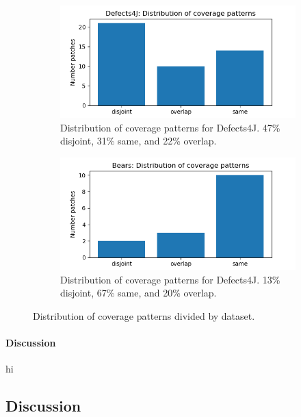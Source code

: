 \begin{figure}[h]
	\begin{subfigure}{\linewidth}
		\includegraphics[width=\linewidth]{img/coverage-d4j.png}
		\caption{Distribution of coverage patterns for Defects4J. 47\% disjoint, 31\% same, and 22\% 
		overlap.}
	\end{subfigure}
	\begin{subfigure}{\linewidth}
		\includegraphics[width=\linewidth]{img/coverage-bears.png}
		\caption{Distribution of coverage patterns for Defects4J. 13\% disjoint, 67\% same, and 20\% 
		overlap.}
	\end{subfigure}
	\caption{Distribution of coverage patterns divided by dataset.}
	\label{fig:coverage-datasets}
\end{figure}

\paragraph{Discussion}

hi



\subsection{Discussion}

